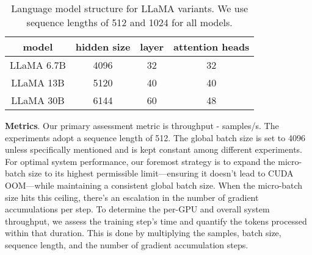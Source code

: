 \begin{table}[]
\caption{Language model structure for LLaMA variants. We use sequence lengths of 512 and 1024 for all models.}
\label{tab:LLaMA_config}
\begin{tabular}{@{}cccc@{}}
\toprule
model     & hidden size & layer & attention heads \\ \midrule
LLaMA 6.7B  & 4096        & 32    & 32              \\
LLaMA 13B & 5120        & 40    & 40              \\ 
LLaMA 30B & 6144        & 60    & 48             \\ \bottomrule
\end{tabular}
\end{table}


\noindent\textbf{Metrics}. Our primary assessment metric is throughput - samples/s. The experiments adopt a sequence length of 512. 
The global batch size is set to 4096 unless specifically mentioned and is kept constant among different experiments. 
For optimal system performance, our foremost strategy is to expand the micro-batch size to its highest permissible limit—ensuring it doesn't lead to CUDA OOM—while maintaining a consistent global batch size. When the micro-batch size hits this ceiling, there's an escalation in the number of gradient accumulations per step. 
To determine the per-GPU and overall system throughput, we assess the training step's time and quantify the tokens processed within that duration. This is done by multiplying the samples, batch size, sequence length, and the number of gradient accumulation steps.

